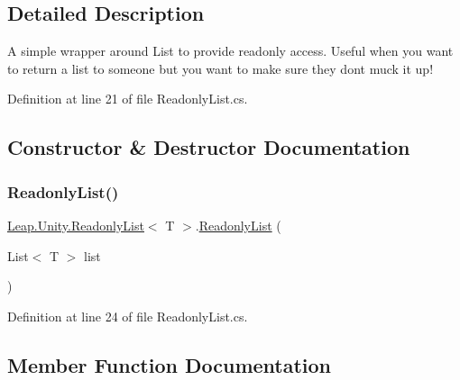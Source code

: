 \subsection{Detailed Description}
A simple wrapper around List to provide readonly access. Useful when you want to return a list to someone but you want to make sure they don\textquotesingle{}t muck it up! 



Definition at line 21 of file Readonly\+List.\+cs.



\subsection{Constructor \& Destructor Documentation}
\mbox{\label{struct_leap_1_1_unity_1_1_readonly_list_a1fb8e8769054f9900e5137bbb12c8f93}} 
\subsubsection{\texorpdfstring{ReadonlyList()}{ReadonlyList()}}
{\footnotesize\ttfamily \mbox{\hyperlink{struct_leap_1_1_unity_1_1_readonly_list}{Leap.\+Unity.\+Readonly\+List}}$<$ T $>$.\mbox{\hyperlink{struct_leap_1_1_unity_1_1_readonly_list}{Readonly\+List}} (\begin{DoxyParamCaption}\item[{List$<$ T $>$}]{list }\end{DoxyParamCaption})}



Definition at line 24 of file Readonly\+List.\+cs.



\subsection{Member Function Documentation}
\mbox{\label{struct_leap_1_1_unity_1_1_readonly_list_adc0d4de6f9f71a6efc8e231aa2fd82e0}} 
